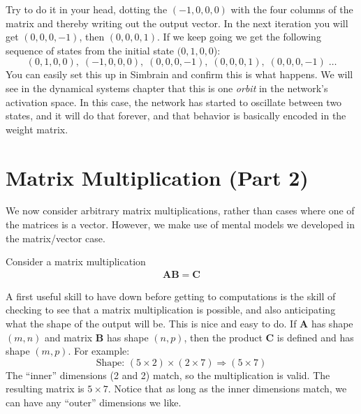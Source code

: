 \noindent Try to do it in your head, dotting the $(-1, 0,0,0)$ with the four columns of the matrix and thereby writing out the output vector. In the next iteration you will get $(0,0,0,-1)$, then $(0,0,0,1)$. If we keep going we get the following sequence of states from the initial state $(0,1,0,0$):
\begin{equation*}
(0,1,0,0),\; (-1,0,0,0),\; (0,0,0,-1),\; (0,0,0,1),\;  (0,0,0,-1)\; \dots
\end{equation*}
You can easily set this up in Simbrain and confirm this is what happens. We will see in the dynamical systems chapter  that this is one \emph{orbit} in the network's activation space. In this case, the network has started to oscillate between two states, and it will do that forever, and that behavior is basically encoded in the weight matrix.

\section{Matrix Multiplication (Part 2)}\label{matrixMultiplication}


We now consider arbitrary matrix multiplications, rather than cases where one of the matrices is a vector. However, we make use of mental models we developed in the matrix/vector case.

Consider a matrix multiplication 
\begin{align*}
\mathbf{A}\mathbf{B} = \mathbf{C}
\end{align*}

A first useful skill to have down before getting to computations is the skill of checking to see that a matrix multiplication is possible, and also anticipating what the shape of the output will be. This is nice and easy to do. If $\mathbf{A}$ has shape $(m, n)$ and matrix $\mathbf{B}$ has shape $(n, p)$, then the product $\mathbf{C}$ is defined and has shape $(m, p)$. For example: 
\[
\text{Shape: } (5 \times 2) \times (2 \times 7) \Rightarrow (5 \times 7)
\]
The ``inner'' dimensions (2 and 2) match, so the multiplication is valid. The resulting matrix is $5 \times 7$. Notice that as long as the inner dimensions match, we can have any ``outer'' dimensions we like. 

